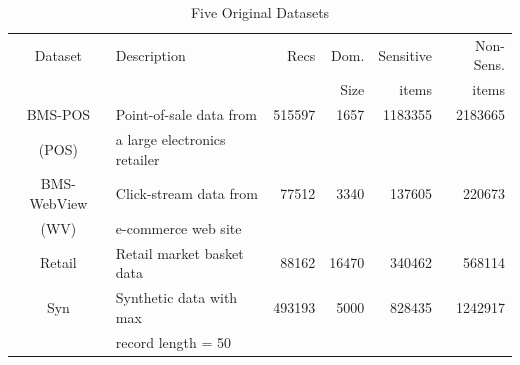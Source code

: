 \begin{table}[th]
\small
\centering
\caption{Five Original Datasets}
\begin{tabular}{|c|l|r|r|r|r|} \hline
Dataset	& Description & Recs & Dom. & Sensitive & Non-Sens.\\
& & & Size & items & items  \\ \hline \hline
BMS-POS &Point-of-sale data from &515597 & 1657&1183355 &  2183665\\
(POS)	& a large electronics retailer   &	&	&	& \\ \hline
BMS-WebView &Click-stream data from &77512 & 3340& 137605 & 220673  \\
(WV) & e-commerce web site  & &  & & \\ \hline
Retail &  Retail market basket data   & 88162&16470 &340462 & 568114  \\ \hline
Syn & Synthetic data with max & 493193 &5000 &828435 & 1242917 \\
 & record length = 50   & & & & \\ \hline
\end{tabular}
\label{tab:datasets}
\end{table}

